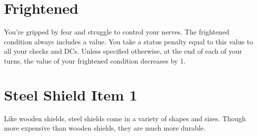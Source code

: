 \documentclass[paper=63mm:88mm, DIV=21, fontsize=7.5pt]{scrartcl}
\begin{document}
\pagestyle{empty}



\setlength\parindent{0pt} %
\setlength\parskip{4pt} %


\renewcommand*{\sectionformat}{}
\renewcommand*{\subsectionformat}{}

\newcommand{\Item}[2]{\section{#2 \hfill \color{gray} Item #1}}
\newcommand{\Action}[4]{\subsection[#4]{#4 \ActionSymbol{#3} \hfill \Reference{#1}{#2}}}

\newcommand{\Requirements}[1]{\paragraph{Requirements} #1.}

\newcommand{\Attribute}[2]{{\engschrift \color{gray} #1 \normalcolor #2}}
\newcommand{\WeaponDamage}[1]{\Attribute{Damage}{#1}}
\newcommand{\ItemHands}[1]{\Attribute{Hands}{#1}}
\newcommand{\ItemBulk}[1]{\Attribute{Bulk}{#1}}
\newcommand{\ItemPrice}[1]{\Attribute{Price}{#1}}
\newcommand{\WeaponType}[1]{\Attribute{Type}{#1}}
\newcommand{\WeaponCategory}[1]{\Attribute{Category}{#1}}
\newcommand{\WeaponGroup}[1]{\Attribute{Group}{#1}}
\newcommand{\Flavor}[1]{\textit{#1}}

\newcommand{\Reference}[2]{{\small \color{gray} \engschrift #1 #2}}
\newcommand{\DamageType}[1]{\operatorname{\mbox{#1}}}


\section{Frightened}

You're gripped by fear and struggle to control your nerves.
The frightened condition always includes a value.
You take a status penalty equal to this value to all your checks and DCs.
Unless specified otherwise, at the end of each of your turns, the value of your frightened condition decreases by 1.

\Item{1}{Steel Shield}

Like wooden shields, steel shields come in a variety of shapes and sizes. Though more expensive than wooden shields, they are much more durable.
\end{document}

